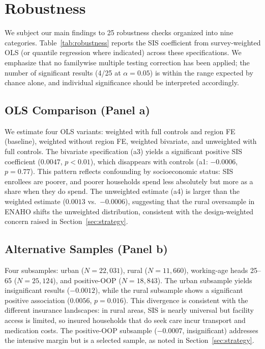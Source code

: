 \section{Robustness}\label{sec:robustness}

We subject our main findings to 25 robustness checks organized into nine categories. Table~\ref{tab:robustness} reports the SIS coefficient from survey-weighted OLS (or quantile regression where indicated) across these specifications. We emphasize that no familywise multiple testing correction has been applied; the number of significant results (4/25 at $\alpha = 0.05$) is within the range expected by chance alone, and individual significance should be interpreted accordingly.



\subsection{OLS Comparison (Panel a)}

We estimate four OLS variants: weighted with full controls and region FE (baseline), weighted without region FE, weighted bivariate, and unweighted with full controls. The bivariate specification (a3) yields a significant positive SIS coefficient ($0.0047$, $p < 0.01$), which disappears with controls (a1: $-0.0006$, $p = 0.77$). This pattern reflects confounding by socioeconomic status: SIS enrollees are poorer, and poorer households spend less absolutely but more as a share when they do spend. The unweighted estimate (a4) is larger than the weighted estimate ($0.0013$ vs.\ $-0.0006$), suggesting that the rural oversample in ENAHO shifts the unweighted distribution, consistent with the design-weighted concern raised in Section~\ref{sec:strategy}.

\subsection{Alternative Samples (Panel b)}

Four subsamples: urban ($N = 22{,}031$), rural ($N = 11{,}660$), working-age heads 25--65 ($N = 25{,}124$), and positive-OOP ($N = 18{,}843$). The urban subsample yields insignificant results ($-0.0012$), while the rural subsample shows a significant positive association ($0.0056$, $p = 0.016$). This divergence is consistent with the different insurance landscapes: in rural areas, SIS is nearly universal but facility access is limited, so insured households that do seek care incur transport and medication costs. The positive-OOP subsample ($-0.0007$, insignificant) addresses the intensive margin but is a selected sample, as noted in Section~\ref{sec:strategy}.

